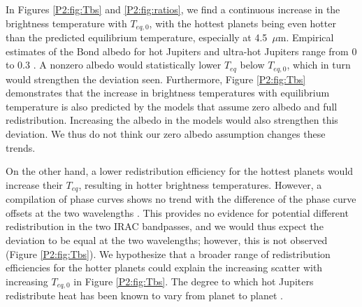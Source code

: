 In Figures \ref{P2:fig:Tbs} and \ref{P2:fig:ratios}, we find a continuous increase in the brightness temperature with $T_{eq,\textit{0}}$, with the hottest planets being even hotter than the predicted equilibrium temperature, especially at 4.5~$\mu$m. Empirical estimates of the Bond albedo for hot Jupiters and ultra-hot Jupiters range from 0 to 0.3 \citep{Schwartz2015, Schwartz2017}. A nonzero albedo would statistically lower $T_{eq}$ below $T_{eq,\textit{0}}$, which in turn would strengthen the deviation seen. Furthermore, Figure \ref{P2:fig:Tbs} demonstrates that the increase in brightness temperatures with equilibrium temperature is also predicted by the models that assume zero albedo and full redistribution. Increasing the albedo in the models would also strengthen this deviation. We thus do not think our zero albedo assumption  changes these trends.

On the other hand, a lower redistribution efficiency for the hottest planets would increase their $T_{eq}$, resulting in hotter brightness temperatures. However, a compilation of \spitzer phase curves shows no trend with the difference of the phase curve offsets at the two \spitzer wavelengths \citep{Beatty2019, Zhang2018a}. This provides no evidence for potential different redistribution in the two IRAC bandpasses, and we would thus expect the deviation to be equal at the two wavelengths; however,  this is not observed (Figure \ref{P2:fig:Tbs}).
We hypothesize that a broader range of redistribution efficiencies for the hotter planets could explain the increasing scatter with increasing $T_{eq,\textit{0}}$ in Figure \ref{P2:fig:Tbs}. The degree to which hot Jupiters redistribute heat has been known to vary from planet to planet \citep{Showman2002, Cowan2007, Cowan2011b, Knutson2007, Showman2011}.

